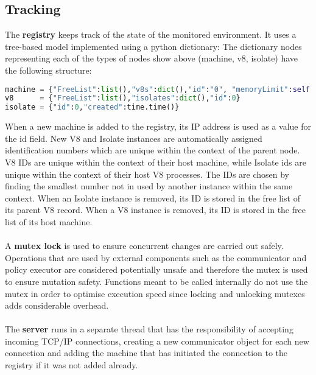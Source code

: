 \documentclass{l4proj}
\begin{document}
\subsection{Tracking}
\hspace*{1em} The \textbf{registry} keeps track of the state of the monitored environment. It uses a tree-based model implemented using a python dictionary:
The dictionary nodes representing each of the types of nodes show above (machine, v8, isolate) have the following structure: 
\begin{lstlisting}[language=python]
machine = {"FreeList":list(),"v8s":dict(),"id":"0", "memoryLimit":self.newMachineMemLimit}
v8      = {"FreeList":list(),"isolates":dict(),"id":0}
isolate = {"id":0,"created":time.time()}
\end{lstlisting}
\hspace*{1em} When a new machine is added to the registry, its IP address is used as a value for the id field. New V8 and Isolate instances are automatically assigned identification numbers which are unique within the context of the parent node. V8 IDs are unique within the context of their host machine, while Isolate ids are unique within the context of their host V8 processes. The IDs are chosen by finding the smallest number not in used by another instance within the same context. When an Isolate instance is removed, its ID is stored in the free list of its parent V8 record. When a V8 instance is removed, its ID is stored in the free list of its host machine.
\\\\
\hspace*{1em} A \textbf{mutex lock} is used to ensure concurrent changes are carried out safely. Operations that are used by external components such as the communicator and policy executor are considered potentially unsafe and therefore the mutex is used to ensure mutation safety. Functions meant to be called internally do not use the mutex in order to optimise execution speed since locking and unlocking mutexes adds considerable overhead.
\\\\
\hspace*{1em} The \textbf{server} runs in a separate thread that has the responsibility of accepting incoming TCP/IP connections, creating a new communicator object for each new connection and adding the machine that has initiated the connection to the registry if it was not added already.
\end{document}
